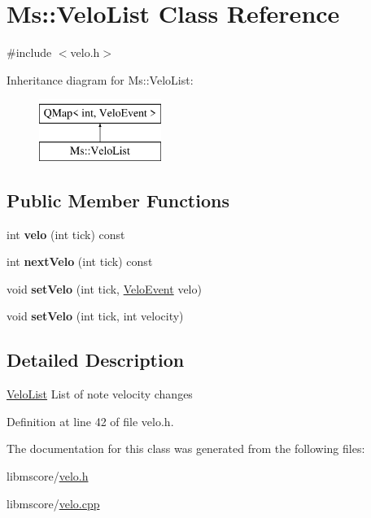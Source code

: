 \hypertarget{class_ms_1_1_velo_list}{}\section{Ms\+:\+:Velo\+List Class Reference}
\label{class_ms_1_1_velo_list}


{\ttfamily \#include $<$velo.\+h$>$}

Inheritance diagram for Ms\+:\+:Velo\+List\+:\begin{figure}[H]
\begin{center}
\leavevmode
\includegraphics[height=2.000000cm]{class_ms_1_1_velo_list}
\end{center}
\end{figure}
\subsection*{Public Member Functions}
\begin{DoxyCompactItemize}
\item 
\mbox{\label{class_ms_1_1_velo_list_ae3bc725de19fe4b470807bb70a154442}} 
int {\bfseries velo} (int tick) const
\item 
\mbox{\label{class_ms_1_1_velo_list_a992acfeae0dd00be6ba128b80e1f1b20}} 
int {\bfseries next\+Velo} (int tick) const
\item 
\mbox{\label{class_ms_1_1_velo_list_aac2cda99347292d5e56cf8702614bfbb}} 
void {\bfseries set\+Velo} (int tick, \hyperlink{struct_ms_1_1_velo_event}{Velo\+Event} velo)
\item 
\mbox{\label{class_ms_1_1_velo_list_a00cd2629f4956bb731f990ea3eb55106}} 
void {\bfseries set\+Velo} (int tick, int velocity)
\end{DoxyCompactItemize}


\subsection{Detailed Description}
\hyperlink{class_ms_1_1_velo_list}{Velo\+List} List of note velocity changes 

Definition at line 42 of file velo.\+h.



The documentation for this class was generated from the following files\+:\begin{DoxyCompactItemize}
\item 
libmscore/\hyperlink{velo_8h}{velo.\+h}\item 
libmscore/\hyperlink{velo_8cpp}{velo.\+cpp}\end{DoxyCompactItemize}
